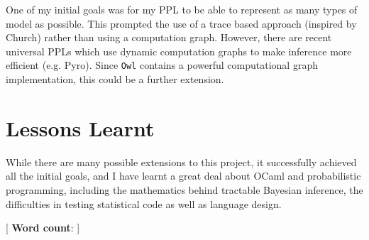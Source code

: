 One of my initial goals was for my PPL to be able to represent as many types of model as possible. This prompted the use of a trace based approach (inspired by Church) rather than using a computation graph. However, there are recent universal PPLs which use dynamic computation graphs to make inference more efficient (e.g. Pyro). Since \texttt{Owl} contains a powerful computational graph implementation, this could be a further extension.

\section{Lessons Learnt}
While there are many possible extensions to this project, it successfully achieved all the initial goals, and I have learnt a great deal about OCaml and probabilistic programming, including the mathematics behind tractable Bayesian inference, the difficulties in testing statistical code as well as language design.

[ {\small \textbf{Word count}: }]